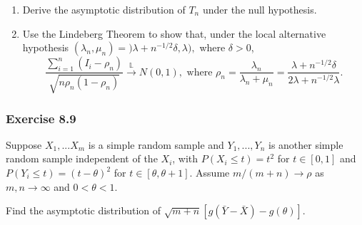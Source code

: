 \documentclass[12pt,]{article}
\begin{document}
\begin{enumerate}
\def\labelenumi{(\alph{enumi})}
\item
  Derive the asymptotic distribution of \(T_n\) under the null
  hypothesis.
\item
  Use the Lindeberg Theorem to show that, under the local alternative
  hypothesis \((\lambda_n,\mu_n)=)\lambda+n^{-1/2}\delta,\lambda),\)
  where \(\delta>0\),
  \[\frac{\sum_{i=1}^n(I_i-\rho_n)}{\sqrt{n\rho_n(1-\rho_n)}}\overset{\mathbb{L}}\rightarrow N(0,1), \text{ where }\rho_n=\frac{\lambda_n}{\lambda_n+\mu_n}=\frac{\lambda+n^{-1/2}\delta}{2\lambda+n^{-1/2}\lambda}.\]
\end{enumerate}

\hypertarget{exercise-8.9}{%
\subsubsection{Exercise 8.9}\label{exercise-8.9}}

Suppose \(X_1,...X_m\) is a simple random sample and \(Y_1,...,Y_n\) is
another simple random sample independent of the \(X_i\), with
\(P(X_i\le t)=t^2\) for \(t\in [0,1]\) and \(P(Y_i\le t)=(t-\theta)^2\)
for \(t\in [\theta, \theta+1]\). Assume \(m/(m+n)\rightarrow \rho\) as
\(m,n\rightarrow \infty\) and \(0<\theta<1.\)

Find the asymptotic distribution of
\(\sqrt{m+n}[g(\bar Y-\bar X)-g(\theta)].\)
\end{document}

